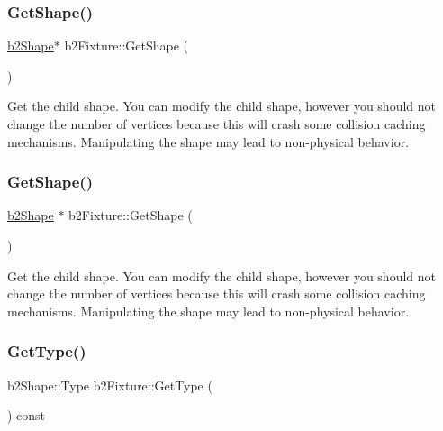 \subsubsection{\texorpdfstring{Get\+Shape()}{GetShape()}\hspace{0.1cm}{\footnotesize\ttfamily [1/2]}}
{\footnotesize\ttfamily \hyperlink{classb2Shape}{b2\+Shape}$\ast$ b2\+Fixture\+::\+Get\+Shape (\begin{DoxyParamCaption}{ }\end{DoxyParamCaption})}

Get the child shape. You can modify the child shape, however you should not change the number of vertices because this will crash some collision caching mechanisms. Manipulating the shape may lead to non-\/physical behavior. \mbox{\label{classb2Fixture_aaa2b73fa212fa53b1c800cccd7a1d31e}} 
\subsubsection{\texorpdfstring{Get\+Shape()}{GetShape()}\hspace{0.1cm}{\footnotesize\ttfamily [2/2]}}
{\footnotesize\ttfamily \hyperlink{classb2Shape}{b2\+Shape} $\ast$ b2\+Fixture\+::\+Get\+Shape (\begin{DoxyParamCaption}{ }\end{DoxyParamCaption})\hspace{0.3cm}{\ttfamily [inline]}}

Get the child shape. You can modify the child shape, however you should not change the number of vertices because this will crash some collision caching mechanisms. Manipulating the shape may lead to non-\/physical behavior. \mbox{\label{classb2Fixture_a7a566c1e3b768f6a72ebc3b758aad70e}} 
\subsubsection{\texorpdfstring{Get\+Type()}{GetType()}\hspace{0.1cm}{\footnotesize\ttfamily [1/2]}}
{\footnotesize\ttfamily b2\+Shape\+::\+Type b2\+Fixture\+::\+Get\+Type (\begin{DoxyParamCaption}{ }\end{DoxyParamCaption}) const\hspace{0.3cm}{\ttfamily [inline]}}

